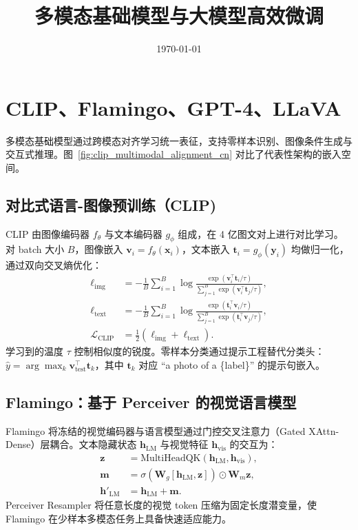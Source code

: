 \documentclass[UTF8,zihao=-4]{ctexart}
\title{多模态基础模型与大模型高效微调}
\author{}
\date{\today}
\begin{document}
\maketitle
\tableofcontents
\FloatBarrier

\section{CLIP、Flamingo、GPT-4、LLaVA}
多模态基础模型通过跨模态对齐学习统一表征，支持零样本识别、图像条件生成与交互式推理。图~\ref{fig:clip_multimodal_alignment_cn} 对比了代表性架构的嵌入空间。

\subsection{对比式语言-图像预训练（CLIP)}
CLIP 由图像编码器 $f_{\theta}$ 与文本编码器 $g_{\phi}$ 组成，在 4 亿图文对上进行对比学习。对 batch 大小 $B$，图像嵌入 $\mathbf{v}_i = f_{\theta}(\mathbf{x}_i)$，文本嵌入 $\mathbf{t}_i = g_{\phi}(\mathbf{y}_i)$ 均做归一化，通过双向交叉熵优化：
\begin{align}
  \ell_{\text{img}} &= -\frac{1}{B} \sum_{i=1}^{B} \log \frac{\exp(\mathbf{v}_i^\top \mathbf{t}_i / \tau)}{\sum_{j=1}^{B} \exp(\mathbf{v}_i^\top \mathbf{t}_j / \tau)}, \\
  \ell_{\text{text}} &= -\frac{1}{B} \sum_{i=1}^{B} \log \frac{\exp(\mathbf{t}_i^\top \mathbf{v}_i / \tau)}{\sum_{j=1}^{B} \exp(\mathbf{t}_i^\top \mathbf{v}_j / \tau)}, \\
  \mathcal{L}_{\text{CLIP}} &= \tfrac{1}{2} (\ell_{\text{img}} + \ell_{\text{text}}).
\end{align}
学习到的温度 $\tau$ 控制相似度的锐度。零样本分类通过提示工程替代分类头：$\hat{y} = \arg\max_{k} \mathbf{v}_{\mathrm{test}}^\top \mathbf{t}_k$，其中 $\mathbf{t}_k$ 对应 ``a photo of a \{label\}'' 的提示句嵌入。

\subsection{Flamingo：基于 Perceiver 的视觉语言模型}
Flamingo 将冻结的视觉编码器与语言模型通过门控交叉注意力（Gated XAttn-Dense）层耦合。文本隐藏状态 $\mathbf{h}_{\mathrm{LM}}$ 与视觉特征 $\mathbf{h}_{\mathrm{vis}}$ 的交互为：
\begin{align}
  \mathbf{z} &= \mathrm{MultiHeadQK}(\mathbf{h}_{\mathrm{LM}}, \mathbf{h}_{\mathrm{vis}}), \\
  \mathbf{m} &= \sigma(\mathbf{W}_g [\mathbf{h}_{\mathrm{LM}}, \mathbf{z}]) \odot \mathbf{W}_m \mathbf{z}, \\
  \mathbf{h}'_{\mathrm{LM}} &= \mathbf{h}_{\mathrm{LM}} + \mathbf{m}.
\end{align}
Perceiver Resampler 将任意长度的视觉 token 压缩为固定长度潜变量，使 Flamingo 在少样本多模态任务上具备快速适应能力。
\end{document}
